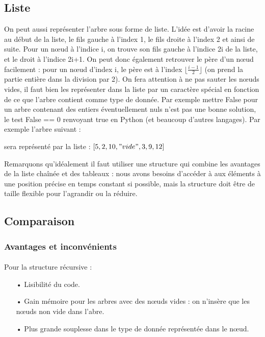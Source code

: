 \documentclass{article}
\begin{document}
\subsection{Liste}
On peut aussi représenter l'arbre sous forme de liste. L'idée est d'avoir la racine au début de la liste, le fils gauche à l'index 1, le fils droite à l'index 2 et ainsi de suite. Pour un nœud à l'indice i, on trouve son fils gauche à l'indice 2i de la liste, et le droit à l'indice 2i+1. 
On peut donc également retrouver le père d'un nœud facilement : pour un nœud d'index i, le père est à l'index $\lfloor \frac{i-1}{2} \rfloor$ (on prend la partie entière dans la division par 2).
On fera attention à ne pas sauter les nœuds vides, il faut bien les représenter dans la liste par un caractère spécial en fonction de ce que l'arbre contient comme type de donnée. Par exemple mettre False pour un arbre contenant des entiers éventuellement nuls n'est pas une bonne solution, le test False == 0 renvoyant true en Python (et beaucoup d'autres langages).
Par exemple l'arbre suivant :

\begin{center}
\end{center}

sera représenté par la liste :
$[5,2,10,"vide",3,9,12]$

Remarquons qu'idéalement il faut utiliser une structure qui combine les avantages de la liste chaînée et des tableaux : nous avons besoins d'accéder à aux éléments à une position précise en temps constant si possible, mais la structure doit être de taille flexible pour l'agrandir ou la réduire. 
\subsection{Comparaison}
\subsubsection{Avantages et inconvénients}
\paragraph*{}
Pour la structure récursive :
\begin{itemize}
\item[•]
Lisibilité du code.
\item[•]
Gain mémoire pour les arbres avec des nœuds vides : on n'insère que les nœuds non vide dans l'abre.
\item[•]
Plus grande souplesse dans le type de donnée représentée dans le nœud.
\end{itemize}
\end{document}
